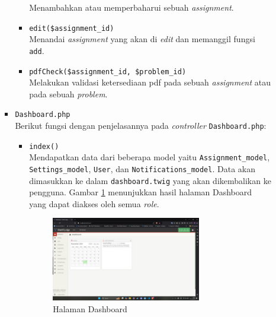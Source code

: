 \documentclass[a4paper,twoside]{article}
\begin{document}
\begin{enumerate}
\begin{itemize}
\begin{itemize}
\begin{itemize}
				                        Menambahkan atau memperbaharui sebuah \textit{assignment}.
				                  \item \verb|edit($assignment_id)| \\
				                        Menandai \textit{assignment} yang akan di \textit{edit} dan memanggil fungsi \verb|add|.
				                  \item \verb|pdfCheck($assignment_id, $problem_id)| \\
				                        Melakukan validasi ketersediaan pdf pada sebuah \textit{assignment} atau pada sebuah \textit{problem}.
			                  \end{itemize}

			            \item \verb|Dashboard.php| \\
			                  Berikut fungsi dengan penjelasannya pada \textit{controller} \verb|Dashboard.php|:

			                  \begin{itemize}
				                  \item \verb|index()| \\
				                        Mendapatkan data dari beberapa model yaitu \verb|Assignment_model|, \verb|Settings_model|, \verb|User|, dan \verb|Notifications_model|. Data akan dimasukkan ke dalam \verb|dashboard.twig| yang akan dikembalikan ke pengguna. Gambar \ref{fig:3:1:1:dashboard} menunjukkan hasil halaman Dashboard yang dapat diakses oleh semua \textit{role}.

				                        \begin{figure}[H]
					                        \centering
					                        \includegraphics[width=0.75\textwidth]{views/dashboard.png}
					                        \caption{Halaman Dashboard}
					                        \label{fig:3:1:1:dashboard}
					                        \vspace{-0.25cm}
				                        \end{figure}



\end{itemize}
\end{itemize}
\end{itemize}
\end{enumerate}
\end{document}
